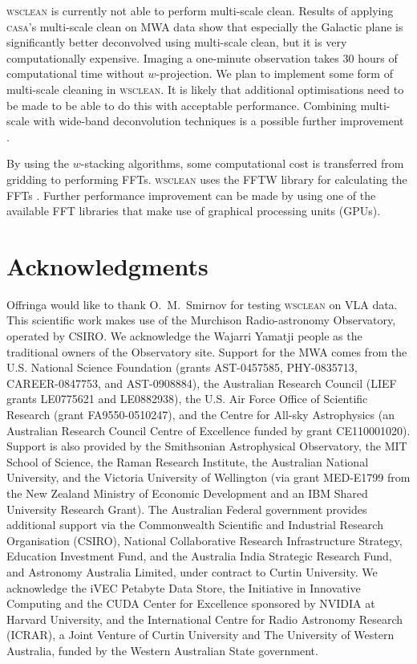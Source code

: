 \documentclass[useAMS,usenatbib]{mn2e}
\begin{document}
\textsc{wsclean} is currently not able to perform multi-scale clean. Results of applying \textsc{casa}'s multi-scale clean \citep{multiscale-clean-cornwell-2008} on MWA data show that especially the Galactic plane is significantly better deconvolved using multi-scale clean, but it is very computationally expensive. Imaging a one-minute observation takes 30 hours of computational time without $w$-projection. We plan to implement some form of multi-scale cleaning in \textsc{wsclean}. It is likely that additional optimisations need to be made to be able to do this with acceptable performance. Combining multi-scale with wide-band deconvolution techniques is a possible further improvement \citep{rau-msmfs-2011}.

By using the $w$-stacking algorithms, some computational cost is transferred from gridding to performing FFTs. \textsc{wsclean} uses the FFTW library for calculating the FFTs \citep{fftw-2005}. Further performance improvement can be made by using one of the available FFT libraries that make use of graphical processing units (GPUs).

\section*{Acknowledgments}
Offringa would like to thank O.~M.~Smirnov for testing \textsc{wsclean} on VLA data.
This scientific work makes use of the Murchison Radio-astronomy Observatory, operated by CSIRO. We acknowledge the Wajarri Yamatji people as the traditional owners of the Observatory site. Support for the MWA comes from the U.S. National Science Foundation (grants AST-0457585, PHY-0835713, CAREER-0847753, and AST-0908884), the Australian Research Council (LIEF grants LE0775621 and LE0882938), the U.S. Air Force Office of Scientific Research (grant FA9550-0510247), and the Centre for All-sky Astrophysics (an Australian Research Council Centre of Excellence funded by grant CE110001020). Support is also provided by the Smithsonian Astrophysical Observatory, the MIT School of Science, the Raman Research Institute, the Australian National University, and the Victoria University of Wellington (via grant MED-E1799 from the New Zealand Ministry of Economic Development and an IBM Shared University Research Grant). The Australian Federal government provides additional support via the Commonwealth Scientific and Industrial Research Organisation (CSIRO), National Collaborative Research Infrastructure Strategy, Education Investment Fund, and the Australia India Strategic Research Fund, and Astronomy Australia Limited, under contract to Curtin University. We acknowledge the iVEC Petabyte Data Store, the Initiative in Innovative Computing and the CUDA Center for Excellence sponsored by NVIDIA at Harvard University, and the International Centre for Radio Astronomy Research (ICRAR), a Joint Venture of Curtin University and The University of Western Australia, funded by the Western Australian State government. 
\end{document}
